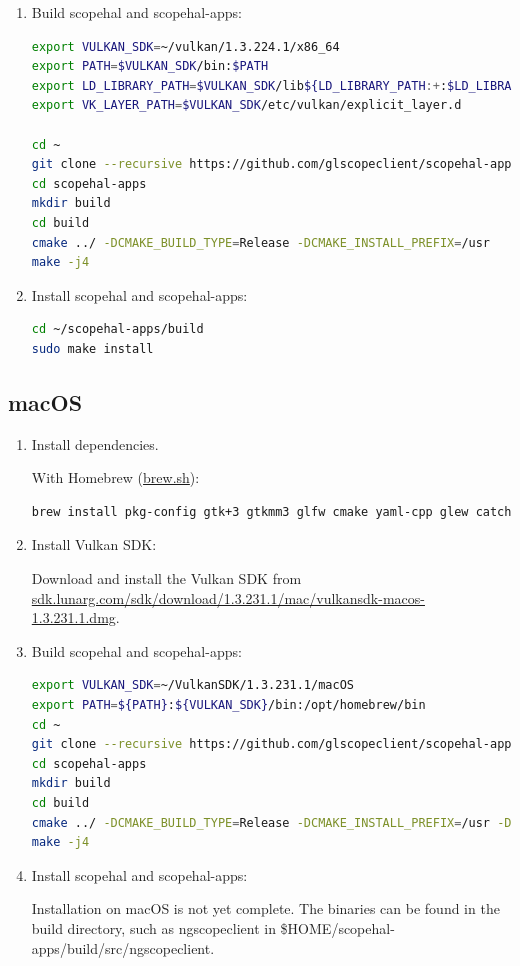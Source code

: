 \begin{enumerate}
\item Build scopehal and scopehal-apps:

\begin{lstlisting}[language=sh, numbers=none]
export VULKAN_SDK=~/vulkan/1.3.224.1/x86_64
export PATH=$VULKAN_SDK/bin:$PATH
export LD_LIBRARY_PATH=$VULKAN_SDK/lib${LD_LIBRARY_PATH:+:$LD_LIBRARY_PATH}
export VK_LAYER_PATH=$VULKAN_SDK/etc/vulkan/explicit_layer.d

cd ~
git clone --recursive https://github.com/glscopeclient/scopehal-apps.git
cd scopehal-apps
mkdir build
cd build
cmake ../ -DCMAKE_BUILD_TYPE=Release -DCMAKE_INSTALL_PREFIX=/usr
make -j4
\end{lstlisting}

\item Install scopehal and scopehal-apps:

\begin{lstlisting}[language=sh, numbers=none]
cd ~/scopehal-apps/build
sudo make install
\end{lstlisting}

\end{enumerate}

\subsection{macOS}
\begin{enumerate}

\item Install dependencies.

With Homebrew (\href{https://brew.sh}{brew.sh}):

\begin{lstlisting}[language=sh, numbers=none]
brew install pkg-config gtk+3 gtkmm3 glfw cmake yaml-cpp glew catch2 libomp
\end{lstlisting}

\item Install Vulkan SDK:

Download and install the Vulkan SDK from \href{https://sdk.lunarg.com/sdk/download/1.3.231.1/mac/vulkansdk-macos-1.3.231.1.dmg}{sdk.lunarg.com/sdk/download/1.3.231.1/mac/vulkansdk-macos-1.3.231.1.dmg}.

\item Build scopehal and scopehal-apps:

\begin{lstlisting}[language=sh, numbers=none]
export VULKAN_SDK=~/VulkanSDK/1.3.231.1/macOS
export PATH=${PATH}:${VULKAN_SDK}/bin:/opt/homebrew/bin
cd ~
git clone --recursive https://github.com/glscopeclient/scopehal-apps.git
cd scopehal-apps
mkdir build
cd build
cmake ../ -DCMAKE_BUILD_TYPE=Release -DCMAKE_INSTALL_PREFIX=/usr -DCMAKE_PREFIX_PATH="/opt/homebrew;/opt/homebrew/opt/libomp"
make -j4
\end{lstlisting}

\item Install scopehal and scopehal-apps:

Installation on macOS is not yet complete.
The binaries can be found in the build directory, such as ngscopeclient in \$HOME/scopehal-apps/build/src/ngscopeclient.

\end{enumerate}

